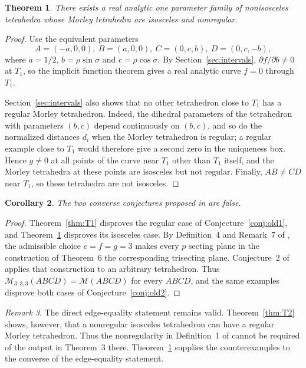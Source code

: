 \documentclass[11pt]{article}
\newtheorem{theorem}{Theorem}[section]
\newtheorem{corollary}[theorem]{Corollary}
\theoremstyle{definition}
\theoremstyle{remark}
\newtheorem{remark}[theorem]{Remark}
\newcommand{\M}{\mathcal M}
\begin{document}
\begin{theorem}
\label{thm:curve} There exists a real analytic one parameter family of nonisosceles tetrahedra whose Morley tetrahedra are isosceles and nonregular.
\end{theorem}

\begin{proof}
Use the equivalent parameters
\[
A=(-a,0,0),\ B=(a,0,0),\ C=(0,c,b),\ D=(0,c,-b),
\]
where $a=1/2$, $b=\rho\sin\sigma$ and $c=\rho\cos\sigma$. By Section~\ref{sec:intervals}, $\partial f/\partial b\ne0$ at $T_1$, so the implicit function theorem gives a real analytic curve $f=0$ through $T_1$.

Section~\ref{sec:intervals} also shows that no other tetrahedron close to $T_1$ has a regular Morley tetrahedron. Indeed, the dihedral parameters of the tetrahedron with parameters $(b,c)$ depend continuously on $(b,c)$, and so do the normalized distances $d_i$ when the Morley tetrahedron is regular; a regular example close to $T_1$ would therefore give a second zero in the uniqueness box. Hence $g\ne0$ at all points of the curve near $T_1$ other than $T_1$ itself, and the Morley tetrahedra at these points are isosceles but not regular. Finally, $AB\ne CD$ near $T_1$, so these tetrahedra are not isosceles.
\end{proof}

\begin{corollary}
The two converse conjectures proposed in \cite{TranActa} are false.
\end{corollary}

\begin{proof}
Theorem~\ref{thm:T1} disproves the regular case of Conjecture~\ref{conj:old1}, and Theorem~\ref{thm:curve} disproves its isosceles case. By Definition~4 and Remark~7 of \cite{TranActa}, the admissible choice $e=f=g=3$ makes every $p$ secting plane in the construction of Theorem~6 the corresponding trisecting plane. Conjecture~2 of \cite{TranActa} applies that construction to an arbitrary tetrahedron. Thus $\M_{3,3,3}(ABCD)=\M(ABCD)$ for every $ABCD$, and the same examples disprove both cases of Conjecture~\ref{conj:old2}.
\end{proof}

\begin{remark}
The direct edge-equality statement remains valid. Theorem~\ref{thm:T2} shows, however, that a nonregular isosceles tetrahedron can have a regular Morley tetrahedron. Thus the nonregularity in Definition~1 of \cite{TranActa} cannot be required of the output in Theorem~3 there. Theorem~\ref{thm:curve} supplies the counterexamples to the converse of the edge-equality statement.
\end{remark}
\end{document}
